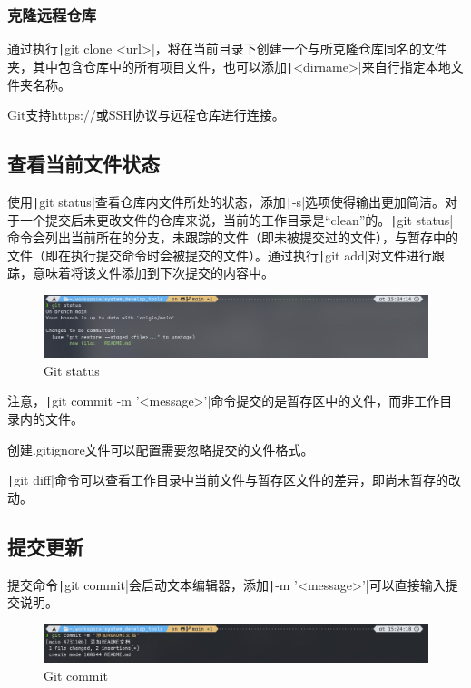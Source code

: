 \documentclass[fontset=ubuntu]{ctexart}
\begin{document}
\subsubsection{克隆远程仓库}
通过执行\texttt|git clone <url>|，将在当前目录下创建一个与所克隆仓库同名的文件夹，其中包含仓库中的所有项目文件，也可以添加\texttt|<dirname>|来自行指定本地文件夹名称。

Git支持https://或SSH协议与远程仓库进行连接。

\subsection{查看当前文件状态}
使用\texttt|git status|查看仓库内文件所处的状态，添加\texttt|-s|选项使得输出更加简洁。对于一个提交后未更改文件的仓库来说，当前的工作目录是“clean”的。\texttt|git status|命令会列出当前所在的分支，未跟踪的文件（即未被提交过的文件），与暂存中的文件（即在执行提交命令时会被提交的文件）。通过执行\texttt|git add|对文件进行跟踪，意味着将该文件添加到下次提交的内容中。
\begin{figure}[htb]
    \centering
    \includegraphics[width=0.75\linewidth]{git_status_1.png}
    \caption{Git status}
    \label{fig:git_status_1}
\end{figure}

注意，\texttt|git commit -m '<message>'|命令提交的是暂存区中的文件，而非工作目录内的文件。

创建.gitignore文件可以配置需要忽略提交的文件格式。

\texttt|git diff|命令可以查看工作目录中当前文件与暂存区文件的差异，即尚未暂存的改动。

\subsection{提交更新}
提交命令\texttt|git commit|会启动文本编辑器，添加\texttt|-m '<message>'|可以直接输入提交说明。
\begin{figure}[htb]
    \centering
    \includegraphics[width=0.75\linewidth]{git_commit_1.png}
    \caption{Git commit}
    \label{fig:git_commit_1}
\end{figure}
\end{document}
